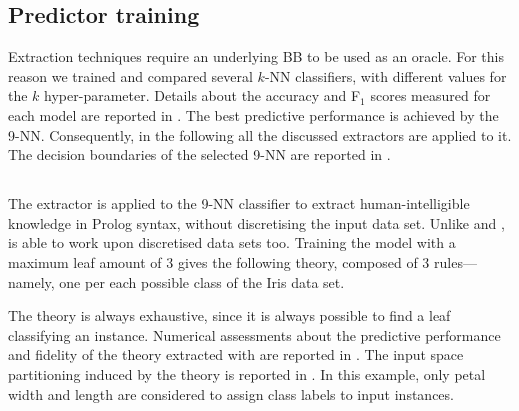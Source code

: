 \documentclass[
]{ceurart}
\begin{document}
\subsection{Predictor training}

Extraction techniques require an underlying BB to be used as an oracle.
%
For this reason we trained and compared several $k$-NN classifiers, with different values for the $k$ hyper-parameter.
%
Details about the accuracy and F$_1$ scores measured for each model are reported in .
%
The best predictive performance is achieved by the 9-NN.
%
Consequently, in the following all the discussed extractors are applied to it.
%
The decision boundaries of the selected 9-NN are reported in .



\subsection{\cart{}}



The \cart{} extractor is applied to the 9-NN classifier to extract human-intelligible knowledge in Prolog syntax, without discretising the input data set.
%
Unlike \iter{} and \gridex{}, \cart{} is able to work upon discretised data sets too.
%
Training the model with a maximum leaf amount of 3 gives the following theory, composed of 3 rules---namely, one per each possible class of the Iris data set.


The theory is always exhaustive, since it is always possible to find a leaf classifying an instance.
%
Numerical assessments about the predictive performance and fidelity of the theory extracted with \cart{} are reported in .
%
The input space partitioning induced by the theory is reported in .
%
In this example, only petal width and length are considered to assign class labels to input instances.

\subsection{\iter{}}


\end{document}
